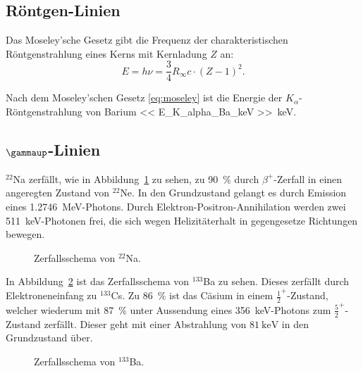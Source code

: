 \subsection{Röntgen-Linien}

Das Moseley'sche Gesetz gibt die Frequenz der charakteristischen
Röntgenstrahlung eines Kerns mit Kernladung $Z$ an:
\parencite[(17.10)]{meschede-gerthsen_24}
\begin{equation}
    \label{eq:moseley}
    E = h \nu = \frac 34 R_\infty c \cdot (Z - 1)^2.
\end{equation}

Nach dem Moseley'schen Gesetz \eqref{eq:moseley} ist die Energie der
$K_\alpha$-Röntgenstrahlung von Barium \SI{<< E_K_alpha_Ba_keV
>>}{\kilo\electronvolt}.

\subsection{$\gammaup$-Linien}

${}^{22}$Na zerfällt, wie in Abbildung~\ref{fig:Na-Zerfall} zu sehen, zu
\SI{90}{\percent} durch $\beta^+$-Zerfall in einen angeregten Zustand von
${}^{22}$Ne. In den Grundzustand gelangt es durch Emission eines
\SI{1.2746}{\mega\electronvolt}-Photons. Durch Elektron-Positron-Annihilation
werden zwei \SI{511}{\kilo\electronvolt}-Photonen frei, die sich wegen
Helizitäterhalt in gegengesetze Richtungen bewegen.

\begin{figure}[htbp]
    \centering
    \caption{%
        Zerfallsschema von ${}^{22}$Na.
    }
    \label{fig:Na-Zerfall}
\end{figure}

In Abbildung~\ref{fig:Ba-Zerfall} ist das Zerfallsschema von ${}^{133}$Ba zu
sehen. Dieses zerfällt durch Elektroneneinfang zu ${}^{133}$Cs. Zu
\SI{86}{\percent} ist das Cäsium in einem $\frac{1}{2}^+$-Zustand, welcher
wiederum mit \SI{87}{\percent} unter Aussendung eines
\SI{356}{\kilo\electronvolt}-Photons zum $\frac{5}{2}^+$-Zustand zerfällt.
Dieser geht mit einer Abstrahlung von $\SI{81}{\kilo\electronvolt}$ in den
Grundzustand über.

\begin{figure}[htbp]
    \centering
    \caption{%
        Zerfallsschema von ${}^{133}$Ba.
    }
    \label{fig:Ba-Zerfall}
\end{figure}

